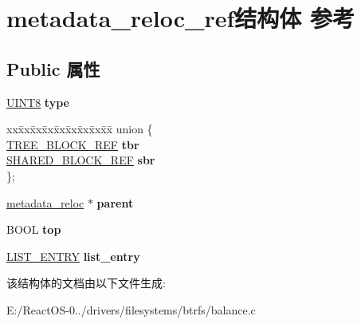 \hypertarget{structmetadata__reloc__ref}{}\section{metadata\+\_\+reloc\+\_\+ref结构体 参考}
\label{structmetadata__reloc__ref}
\subsection*{Public 属性}
\begin{DoxyCompactItemize}
\item 
\mbox{\label{structmetadata__reloc__ref_a5e04bafa75a9d62d9c29f537f7717d14}} 
\hyperlink{_processor_bind_8h_ab27e9918b538ce9d8ca692479b375b6a}{U\+I\+N\+T8} {\bfseries type}
\item 
\mbox{\label{structmetadata__reloc__ref_ac7fef429f5b530bf1fc39be992649aed}} 
\begin{tabbing}
xx\=xx\=xx\=xx\=xx\=xx\=xx\=xx\=xx\=\kill
union \{\\
\>\hyperlink{struct_t_r_e_e___b_l_o_c_k___r_e_f}{TREE\_BLOCK\_REF} {\bfseries tbr}\\
\>\hyperlink{struct_s_h_a_r_e_d___b_l_o_c_k___r_e_f}{SHARED\_BLOCK\_REF} {\bfseries sbr}\\
\}; \\

\end{tabbing}\item 
\mbox{\label{structmetadata__reloc__ref_ac877e659f495381cbfdf9ed6081ac1fe}} 
\hyperlink{structmetadata__reloc}{metadata\+\_\+reloc} $\ast$ {\bfseries parent}
\item 
\mbox{\label{structmetadata__reloc__ref_afd8e385b543e42eddc7258e7a0e6b01d}} 
B\+O\+OL {\bfseries top}
\item 
\mbox{\label{structmetadata__reloc__ref_a807e5aaf730e1779bd75b4f43ec686d9}} 
\hyperlink{struct___l_i_s_t___e_n_t_r_y}{L\+I\+S\+T\+\_\+\+E\+N\+T\+RY} {\bfseries list\+\_\+entry}
\end{DoxyCompactItemize}


该结构体的文档由以下文件生成\+:\begin{DoxyCompactItemize}
\item 
E\+:/\+React\+O\+S-\/0../drivers/filesystems/btrfs/balance.\+c\end{DoxyCompactItemize}
